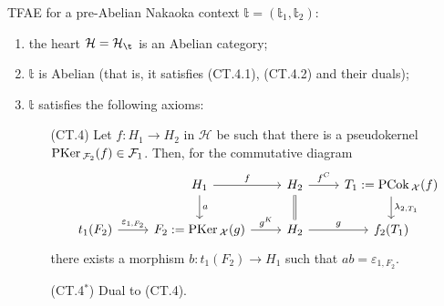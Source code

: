 \begin{thm}
TFAE for a pre-Abelian Nakaoka context $\mathbb{t}=(\mathbb{t}_1,\mathbb{t}_2)$:
\begin{enumerate}[label=(\alph*)]
\item the heart $\mathcal{H}=\H_\t$ is an Abelian category;
\item $\mathbb{t}$ is Abelian (that is, it satisfies (CT.4.1), (CT.4.2) and their duals);
\item $\mathbb{t}$ satisfies the following axioms:
\begin{enumerate}
\item[(CT.4)] Let $f:H_1\to H_2$ in $\mathcal{H}$ be such that there is a pseudokernel $\mathrm{\textup{PKer\,}}_{\mathcal{F}_2}(f)\in\mathcal{F}_1$. Then, for the commutative diagram
\begin{equation*}
\begin{tikzcd}
 & H_1\arrow{d}{a}\arrow{r}{f} & H_2\arrow[equal]{d}\arrow{r}{f^C} & T_1:=\PCok_\mathcal{X}(f)\arrow{d}{\lambda_{2,T_1}}\\
t_1(F_2)\arrow{r}{\varepsilon_{1,F_2}} & F_2:=\PKer_\mathcal{X}(g)\arrow{r}{g^K} & H_2\arrow{r}{g} & f_2(T_1)
\end{tikzcd}
\end{equation*}
there exists a morphism $b:t_1(F_2)\to H_1$ such that $ab=\varepsilon_{1,F_2}$.
\item[(CT.4$^*$)] Dual to (CT.4).
\end{enumerate}
\end{enumerate}
\end{thm}
